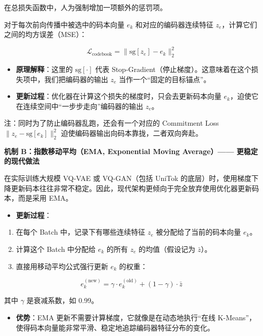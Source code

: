在总损失函数中，人为强制增加一项额外的惩罚项。

对于每次前向传播中被选中的码本向量 \(e_k\) 和对应的编码器连续特征 \(z_e\)，计算它们之间的均方误差（MSE）：

\[
\mathcal{L}_{\mathrm{codebook}}
=\lVert \mathrm{sg}[z_e]-e_k\rVert_2^2
\]

\begin{itemize}
\tightlist
\item
  \textbf{原理解释}：这里的 \(\mathrm{sg}[\cdot]\) 代表 Stop-Gradient（停止梯度）。这意味着在这个损失项中，我们把编码器的输出 \(z_e\) 当作一个``固定的目标锚点''。
\item
  \textbf{更新过程}：优化器在计算这个损失的梯度时，只会去更新码本向量 \(e_k\)，迫使它在连续空间中``一步步走向''编码器的输出 \(z_e\)。
\end{itemize}

注：同时为了防止编码器乱跑，还会有一个对应的 Commitment Loss \(\lVert z_e-\mathrm{sg}[e_k]\rVert_2^2\) 迫使编码器输出向码本靠拢，二者双向奔赴。

\textbf{机制 B：指数移动平均（EMA, Exponential Moving Average）------ 更稳定的现代做法}

在实际训练大规模 VQ-VAE 或 VQ-GAN（包括 UniTok 的底层）时，使用梯度下降更新码本往往非常不稳定。因此，现代架构更倾向于完全放弃使用优化器更新码本，而是采用 EMA。

\begin{itemize}
\tightlist
\item
{}
  \textbf{更新过程}：
\end{itemize}

\begin{enumerate}
\def\labelenumi{\arabic{enumi}.}
\tightlist
\item
  在每个 Batch 中，记录下有哪些连续特征 \(z_e\) 被分配给了当前的码本向量 \(e_k\)。
\item
  计算这个 Batch 中分配给 \(e_k\) 的所有 \(z_e\) 的均值（假设记为 \(\bar z\)）。
\item
{}
  直接用移动平均公式强行更新 \(e_k\) 的权重：
\end{enumerate}

\[
e_k^{(\mathrm{new})}
=\gamma\cdot e_k^{(\mathrm{old})}+(1-\gamma)\cdot\bar z
\]

其中 \(\gamma\) 是衰减系数，如 0.99。

\begin{itemize}
\tightlist
\item
  \textbf{优势}：EMA 更新不需要计算梯度，它就像是在动态地执行``在线 K-Means''，使得码本向量能非常平滑、稳定地追踪编码器特征分布的变化。
\end{itemize}

